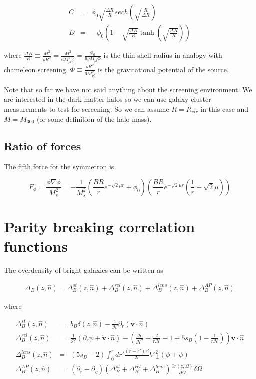 \documentclass[aps,showpacs,onecolumn,floats,prd,superscriptaddress,nofootinbib]{revtex4-1}
\begin{document}
\begin{eqnarray}
	C & = & \phi_0 \sqrt{\frac{\Delta R}{R}} sech \left( \sqrt{\frac{R}{\Delta R}} \right)	\nonumber \\
	D & = & - \phi_0 \left(1 - \sqrt{\frac{\Delta R}{R}} \tanh \left( \sqrt{\frac{\Delta R}{R}}\right) \right)
\end{eqnarray}

where $\frac{\Delta R}{R} \equiv \frac{M^2}{\rho R^2} = \frac{M^2}{6 M_{pl}^2\phi} = \frac{\phi_0}{6gM_{pl} \Phi}$ is the thin shell radius in analogy with chameleon screening. $\Phi \equiv \frac{\rho R^2}{6 M_{pl}^2}$ is the gravitational potential of the source. 

Note that so far we have not said anything about the screening environment. 
We are interested in the dark matter halos so we can use galaxy cluster measurements to test for screening. So we can assume $R = R_{vir}$ in this case and $M = M_{300}$ (or some definition of the halo mass). 

\subsection{Ratio of forces}

The fifth force for the symmetron is

\begin{equation}
	F_\phi = \frac{\phi\nabla \phi}{M_s^2} = - \frac{1}{M_s^2} \left(\frac{BR}{r} e^{-\sqrt{2} \mu r} + \phi_0 \right) \left( \frac{BR}{r} e^{-\sqrt{2}\mu r} \left( \frac{1}{r} + \sqrt{2} \mu \right) \right)
\end{equation}

\section{Parity breaking correlation functions}

The overdensity of bright galaxies can be written as

\begin{eqnarray}
	\Delta_{B}(z,\hat{n}) = \Delta_B^{st}(z,\hat{n}) + \Delta_B^{rel} (z,\hat{n})+\Delta_B^{lens} (z,\hat{n}) + \Delta_B^{AP} (z,\hat{n}) 
\end{eqnarray}

where 

\begin{eqnarray}
	\Delta^{st}_B(z,\hat{n}) & = & b_B \delta(z,\hat{n}) - \frac{1}{\mathcal{H}} \partial_r(\textbf{v}\cdot \hat{n}) 	\\
	\Delta^{rel}_B(z,\hat{n}) & = & \frac{1}{\mathcal{H}} \left( \partial_r \psi + \dot{\textbf{v}}\cdot \hat{n} \right) - \left( \frac{\dot{\mathcal{H}}}{\mathcal{H}^2} + \frac{2}{r\mathcal{H}} - 1 + 5s_B \left( 1 - \frac{1}{r \mathcal{H}} \right) \right) \textbf{v} \cdot \hat{n} \label{rel_screen} \\
	\Delta^{lens}_B(z,\hat{n}) & = & (5s_B -2) \int^r_0 dr' \frac{(r-r')r'}{2r} \nabla^2_\bot (\phi + \psi) \\
	\Delta^{AP}_{B}(z,\hat{n}) & = & (\partial_r - \partial_\eta) (\Delta^{st}_B + \Delta^{rel}_B + \Delta^{lens}_B )\frac{\partial r(z,\Omega)}{\partial \Omega} \delta \Omega
\end{eqnarray}
\end{document}

